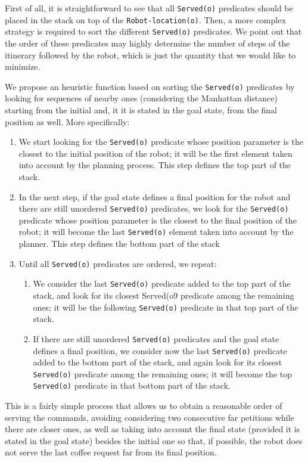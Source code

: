 \documentclass[12pt,a4paper,oneside]{article}
\numberwithin{equation}{section}
\numberwithin{equation}{section}
\theoremstyle{definition}
\begin{document}
First of all, it is straightforward to see that all \texttt{Served(o)} predicates should be placed in the stack on top of the \texttt{Robot-location(o)}. Then, a more complex strategy is required to sort the different \texttt{Served(o)} predicates. We point out that the order of these predicates may highly determine the number of steps of the itinerary followed by the robot, which is just the quantity that we would like to minimize. 


We propose an heuristic function based on sorting the \texttt{Served(o)} predicates by looking for sequences of nearby ones (considering the Manhattan distance) starting from the initial and, it it is stated in the goal state, from the final position as well. More specifically:
\begin{enumerate}
	\item We start looking for the \texttt{Served(o)} predicate whose position parameter is the closest to the initial position of the robot; it will be the first element taken into account by the planning process. This step defines the top part of the stack.
	\item In the next step, if the goal state defines a final position for the robot and there are still unordered \texttt{Served(o)} predicates, we look for the \texttt{Served(o)} predicate whose position parameter is the closest to the final position of the robot; it will become the last \texttt{Served(o)} element taken into account by the planner. This step defines the bottom part of the stack
	\item Until all \texttt{Served(o)} predicates are ordered, we repeat:
	\begin{enumerate}
		\item We consider the last \texttt{Served(o)} predicate added to the top part of the stack, and look for its closest Served(o9 predicate among the remaining ones; it will be the following \texttt{Served(o)} predicate in that top part of the stack.
		\item If there are still unordered \texttt{Served(o)} predicates and the goal state defines a final position, we consider now the last \texttt{Served(o)} predicate added to the bottom part of the stack, and again look for its closest \texttt{Served(o)} predicate among the remaining ones; it will become the top \texttt{Served(o)} predicate in that bottom part of the stack.
	\end{enumerate}
\end{enumerate}
This is a fairly simple process that allows us to obtain a reasonable order of serving the commands, avoiding considering two consecutive far petitions while there are closer ones, as well as taking into account the final state (provided it is stated in the goal state) besides the initial one so that, if possible, the robot does not serve the last coffee request far from its final position. 
\end{document}
